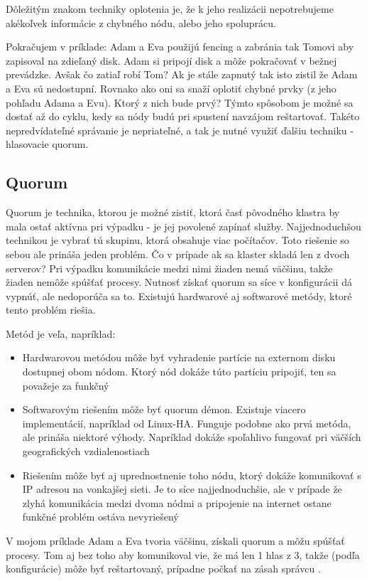 Dôležitým znakom techniky oplotenia je, že k jeho realizácii nepotrebujeme akékoľvek informácie z chybného nódu, alebo jeho spoluprácu.

Pokračujem v príklade:
Adam a Eva použijú fencing a zabránia tak Tomovi aby zapisoval na zdieľaný disk. Adam si pripojí disk a môže pokračovať v bežnej prevádzke. Avšak čo zatiaľ robí Tom? Ak je stále zapnutý tak isto zistil že Adam a Eva sú nedostupní. Rovnako ako oni sa snaží oplotiť chybné prvky (z jeho pohľadu Adama a Evu). Ktorý z nich bude prvý? Týmto spôsobom je možné sa dostať až do cyklu, kedy sa nódy budú pri spustení navzájom reštartovať. Takéto nepredvídateľné správanie je nepriateľné, a tak je nutné využiť ďalšiu techniku - hlasovacie quorum.

\subsection{Quorum}
Quorum je technika, ktorou je možné zistiť, ktorá časť pôvodného klastra by mala ostať aktívna pri výpadku - je jej povolené zapínať služby. Najjednoduchšou technikou je vybrať tú skupinu, ktorá obsahuje viac počítačov.
Toto riešenie so sebou ale prináša jeden problém. Čo v prípade ak sa klaster skladá len z dvoch serverov? Pri výpadku komunikácie medzi nimi žiaden nemá väčšinu, takže žiaden nemôže spúšťať procesy. Nutnosť získať quorum sa síce v konfigurácii dá vypnúť, ale nedoporúča sa to. Existujú hardwarové aj softwarové metódy, ktoré tento problém riešia.

Metód je veľa, napríklad:
\begin{itemize}
	\item Hardwarovou metódou môže byť vyhradenie partície na externom disku dostupnej obom nódom. Ktorý nód dokáže túto partíciu pripojiť, ten sa považeje za funkčný
	\item Softwarovým riešením môže byť quorum démon. Existuje viacero implementácií, napríklad od Linux-HA. Funguje podobne ako prvá metóda, ale prináša niektoré výhody. Napríklad dokáže spoľahlivo fungovať pri väčších geografických vzdialenostiach
	\item Riešením môže byť aj uprednostnenie toho nódu, ktorý dokáže komunikovať s IP adresou na vonkajšej sieti. Je to síce najjednoduchšie, ale v prípade že zlyhá komunikácia medzi dvoma nódmi a pripojenie na internet ostane funkčné problém ostáva nevyriešený
\end{itemize}

V mojom príklade Adam a Eva tvoria väčšinu, získali quorum a môžu spúšťať procesy. Tom aj bez toho aby komunikoval vie, že má len 1 hlas z 3, takže (podľa konfigurácie) môže byť reštartovaný, prípadne počkať na zásah správcu \cite{web:split-brain-quo}.

